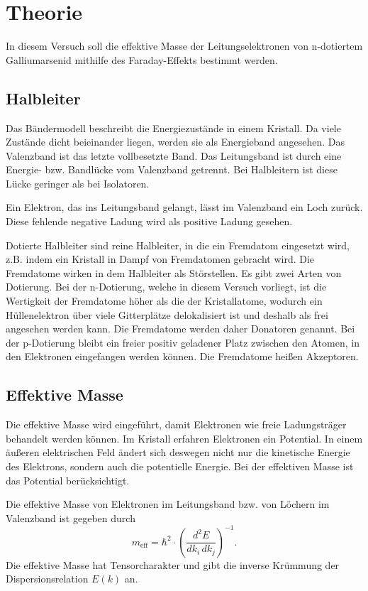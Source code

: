 \section{Theorie}
\label{sec:Theorie}
In diesem Versuch soll die effektive Masse der Leitungselektronen von n-dotiertem Galliumarsenid mithilfe des Faraday-Effekts bestimmt werden. 
\subsection{Halbleiter}
Das Bändermodell beschreibt die Energiezustände in einem Kristall. Da viele Zustände dicht beieinander liegen, werden sie als Energieband angesehen. Das Valenzband ist das letzte vollbesetzte Band. Das Leitungsband ist durch eine Energie- bzw. Bandlücke vom Valenzband getrennt. Bei Halbleitern ist diese Lücke geringer als bei Isolatoren. 

Ein Elektron, das ins Leitungsband gelangt, lässt im Valenzband ein Loch zurück. Diese fehlende negative Ladung wird als positive Ladung gesehen. \cite{demtroeder}

Dotierte Halbleiter sind reine Halbleiter, in die ein Fremdatom eingesetzt wird, z.B. indem ein Kristall in Dampf von Fremdatomen gebracht wird. Die Fremdatome wirken in dem Halbleiter als Störstellen.
Es gibt zwei Arten von Dotierung. Bei der n-Dotierung, welche in diesem Versuch vorliegt, ist die Wertigkeit der Fremdatome höher als die der Kristallatome, wodurch ein Hüllenelektron über viele Gitterplätze delokalisiert ist und deshalb als frei angesehen werden kann. Die Fremdatome werden daher Donatoren genannt. Bei der p-Dotierung bleibt ein freier positiv geladener Platz zwischen den Atomen, in den Elektronen eingefangen werden können. Die Fremdatome heißen Akzeptoren. \cite{demtroeder}

\subsection{Effektive Masse}
Die effektive Masse wird eingeführt, damit Elektronen wie freie Ladungsträger behandelt werden können. Im Kristall erfahren Elektronen ein Potential. In einem äußeren elektrischen Feld ändert sich deswegen nicht nur die kinetische Energie des Elektrons, sondern auch die potentielle Energie. Bei der effektiven Masse ist das Potential berücksichtigt. \cite{demtroeder}

Die effektive Masse von Elektronen im Leitungsband bzw. von Löchern im Valenzband ist gegeben durch
\begin{equation*}
    m_\text{eff} = \hbar^2 \cdot \left( \frac{d^2 E}{dk_i \, dk_j} \right)^{-1}.
\end{equation*}
Die effektive Masse hat Tensorcharakter und gibt die inverse Krümmung der Dispersionsrelation $E(k)$ an. \cite{demtroeder}

